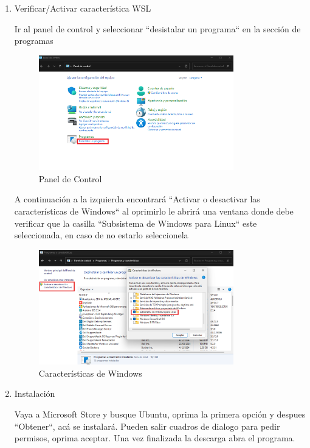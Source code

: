 \documentclass{article}
\begin{document}
\begin{enumerate}
    \item Verificar/Activar característica WSL
    
    Ir al panel de control y seleccionar ``desistalar un programa`` en la sección de programas

    \begin{figure}[H]
    \centering
    \includegraphics[width=0.8\textwidth]{images/manualUsuarioErlangBC_6.png}
    \caption{Panel de Control}
    \label{fig:version}
\end{figure}

A continuación a la izquierda encontrará ``Activar o desactivar las características de Windows`` al oprimirlo le abrirá una ventana donde debe verificar que la casilla ``Subsistema de Windows para Linux`` este seleccionada, en caso de no estarlo seleccionela

\begin{figure}[H]
    \centering
    \includegraphics[width=0.8\textwidth]{images/manualUsuarioErlangBC_7.png}
    \caption{Características de Windows}
    \label{fig:version}
\end{figure}

    \item Instalación
    
    Vaya a Microsoft Store y busque Ubuntu, oprima la primera opción y despues ``Obtener``, acá se instalará. Pueden salir cuadros de dialogo para pedir permisos, oprima aceptar. Una vez finalizada la descarga abra el programa.


\end{enumerate}
\end{document}

